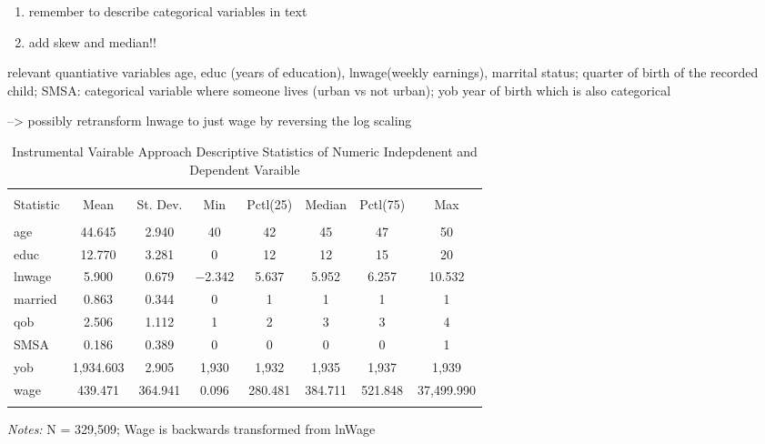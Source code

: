 \documentclass[a4paper]{article}
\begin{document}
\begin{enumerate}
   \item remember to describe categorical variables in text
   \item add skew and median!!
\end{enumerate}


relevant quantiative variables age, educ (years of education), lnwage(weekly earnings), marrital status; quarter of birth of the recorded child; SMSA: categorical variable where someone lives (urban vs not urban); yob year of birth which is also categorical

--> possibly retransform lnwage to just wage by reversing the log scaling


\begin{table}[!htbp] 
\begin{adjustwidth}{-0cm}{-0cm}
\begin{threeparttable}
\small
\captionsetup{font=small, justification=raggedright,singlelinecheck=false}
  \caption{Instrumental Vairable Approach Descriptive Statistics of Numeric Indepdenent and Dependent Varaible} 
  \label{} 
\begin{tabular}{@{\extracolsep{5pt}}lccccccc} 
\\[-1.8ex]\hline 
\hline \\[-1.8ex] 
Statistic & \multicolumn{1}{c}{Mean} & \multicolumn{1}{c}{St. Dev.} & \multicolumn{1}{c}{Min} & \multicolumn{1}{c}{Pctl(25)} & \multicolumn{1}{c}{Median} & \multicolumn{1}{c}{Pctl(75)} & \multicolumn{1}{c}{Max} \\ 
\hline \\[-1.8ex] 
age & 44.645 & 2.940 & 40 & 42 & 45 & 47 & 50 \\ 
educ & 12.770 & 3.281 & 0 & 12 & 12 & 15 & 20 \\ 
lnwage & 5.900 & 0.679 & $-$2.342 & 5.637 & 5.952 & 6.257 & 10.532 \\ 
married & 0.863 & 0.344 & 0 & 1 & 1 & 1 & 1 \\ 
qob & 2.506 & 1.112 & 1 & 2 & 3 & 3 & 4 \\ 
SMSA & 0.186 & 0.389 & 0 & 0 & 0 & 0 & 1 \\ 
yob & 1,934.603 & 2.905 & 1,930 & 1,932 & 1,935 & 1,937 & 1,939 \\ 
wage & 439.471 & 364.941 & 0.096 & 280.481 & 384.711 & 521.848 & 37,499.990 \\ 
\hline \\[-3.5ex] 
\end{tabular} 
\begin{tablenotes}
      \small
      \item\textit{Notes:} N = 329,509; Wage is backwards transformed from lnWage
    \end{tablenotes}
\end{threeparttable}
\end{adjustwidth}
\end{table}
\end{document}
